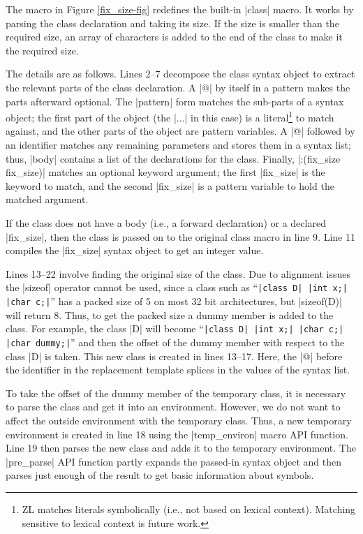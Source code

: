 The macro in Figure \ref{fix_size-fig} redefines the built-in |class|
macro.  It works by parsing the class declaration and taking its size.
If the size is smaller than the required size, an array of characters
is added to the end of the class to make it the required size.

The details are as follows. Lines 2--7 decompose the class syntax
object to extract the relevant parts of the class declaration.  A |@|
by itself in a pattern makes the parts afterward optional.  The
|pattern| form matches the sub-parts of a syntax object; the first
part of the object (the |{...}| in this case) is a literal\footnote{ZL
  matches literals symbolically (i.e., not based on lexical context).
  Matching sensitive to lexical context is future work.} to match
against, and the other parts of the object are pattern variables.  A
|@| followed by an identifier matches any remaining parameters and
stores them in a syntax list; thus, |body| contains a list of the
declarations for the class.  Finally, |:(fix_size fix_size)| matches
an optional keyword argument; the first |fix_size| is the keyword to
match, and the second |fix_size| is a pattern variable to hold the
matched argument.

If the class does not have a body (i.e., a forward declaration) or a
declared |fix_size|, then the class is passed on to the original class
macro in line 9.  Line 11 compiles the |fix_size| syntax object to get
an integer value.

Lines 13--22 involve finding the original size of the class.  Due to
alignment issues the |sizeof| operator cannot be used, since a class
such as ``{\tt |class D| |{int x;| |char c;}|}'' has a packed size of
5 on most 32 bit architectures, but |sizeof(D)| will return 8.  Thus,
to get the packed size a dummy member is added to the
class.  For example, the class |D| will become ``{\tt |class D| |{int x;|
    |char c;| |char dummy;}|}'' and then the offset of the dummy member
with respect to the class |D| is taken.  This new class is created in
lines 13--17.  Here, the |@| before the identifier in the replacement template
splices in the values of the syntax list.

To take the offset of the dummy member of the
temporary class, it is necessary to parse the class and get it into an
environment.  However, we do not want to affect the outside
environment with the temporary class.  Thus, a new temporary environment
is created in line 18 using the |temp_environ| macro API
function.  Line 19 then parses the
new class and adds it to the temporary environment.  The
|pre_parse| API function partly expands the passed-in syntax object and
then parses just enough of the result to get basic information 
about symbols.

